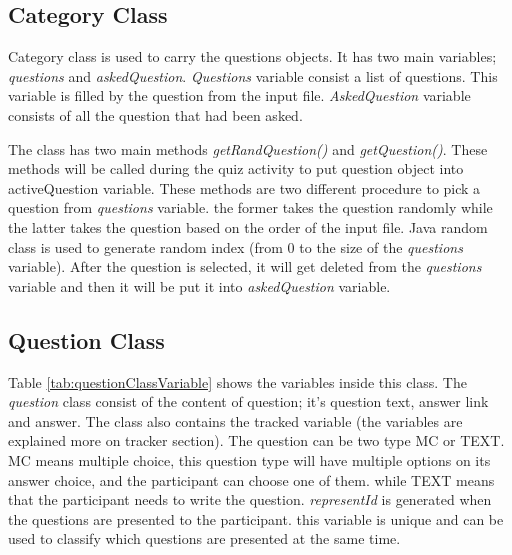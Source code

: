 \subsection{Category Class}
Category class is used to carry the questions objects.
It has two main variables; \textit{questions} and \textit{askedQuestion}.
\textit{Questions} variable consist a list of questions. This variable is filled by
the question from the input file.
\textit{AskedQuestion} variable consists of all the question that had been asked.

The class has two main methods \textit{getRandQuestion()} and \textit{getQuestion()}.
These methods will be called during the quiz activity to put question object into activeQuestion variable.
These methods are two different procedure to pick a question from \textit{questions} variable.
the former takes the question randomly while the latter takes the question based on the order of the input file.
Java random class is used to generate random index (from 0 to the size of the \textit{questions} variable).
After the question is selected, it will get deleted from the \textit{questions} variable and then it will be put it into \textit{askedQuestion} variable.

\subsection{Question Class}
Table \ref{tab:questionClassVariable} shows the variables inside this class.
The \textit{question} class consist of the content of question; it's question text, answer link and answer.
The class also contains the tracked variable (the variables are explained more on tracker section).
The question can be two type MC or TEXT. MC means multiple choice, this question type will have multiple options on its answer choice,
and the participant can choose one of them. while TEXT means that the participant needs to write the question.
\textit{representId} is generated when the questions are presented to the participant. this variable is unique and can
be used to classify which questions are presented at the same time.

